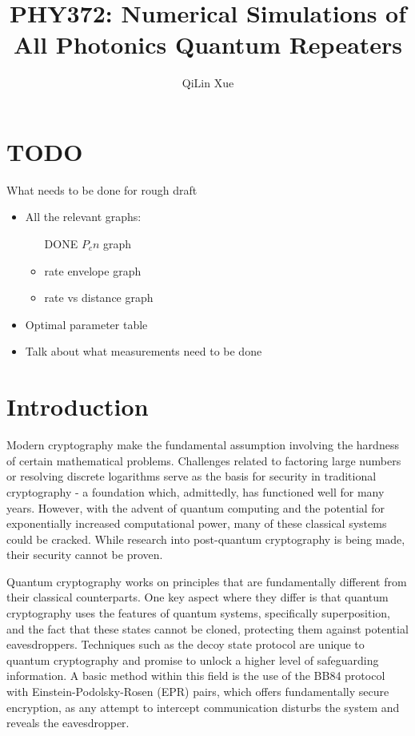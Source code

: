\documentclass[%
 reprint,
 amsmath,amssymb
 aps,
]{revtex4}
\theoremstyle{remark}
\begin{document}
\title{PHY372: Numerical Simulations of All Photonics Quantum Repeaters}
\author{QiLin Xue}
\maketitle
\tableofcontents
\vspace{4mm}
\section{TODO}
What needs to be done for rough draft 
\begin{itemize}
    \item All the relevant graphs:
    \begin{itemize}
        \item [DONE] $P_cn$ graph 
        \item rate envelope graph
        \item rate vs distance graph
    \end{itemize}
    \item Optimal parameter table
    \item Talk about what measurements need to be done
\end{itemize}
\newpage
\section{Introduction}
Modern cryptography make the fundamental assumption involving the hardness of certain mathematical problems. Challenges related to factoring large numbers or resolving discrete logarithms serve as the basis for security in traditional cryptography - a foundation which, admittedly, has functioned well for many years. However, with the advent of quantum computing and the potential for exponentially increased computational power, many of these classical systems could be cracked. While research into post-quantum cryptography is being made, their security cannot be proven.
\vspace{2mm}

Quantum cryptography works on principles that are fundamentally different from their classical counterparts. One key aspect where they differ is that quantum cryptography uses the features of quantum systems, specifically superposition, and the fact that these states cannot be cloned, protecting them against potential eavesdroppers. Techniques such as the decoy state protocol are unique to quantum cryptography and promise to unlock a higher level of safeguarding information. A basic method within this field is the use of the BB84 protocol with Einstein-Podolsky-Rosen (EPR) pairs, which offers fundamentally secure encryption, as any attempt to intercept communication disturbs the system and reveals the eavesdropper.
\vspace{2mm}
\end{document}
